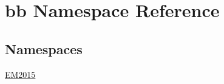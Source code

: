 \hypertarget{namespacebb}{}\section{bb Namespace Reference}
\label{namespacebb}
\subsection*{Namespaces}
\begin{DoxyCompactItemize}
\item 
 \hyperlink{namespacebb_1_1_e_m2015}{E\+M2015}
\end{DoxyCompactItemize}
